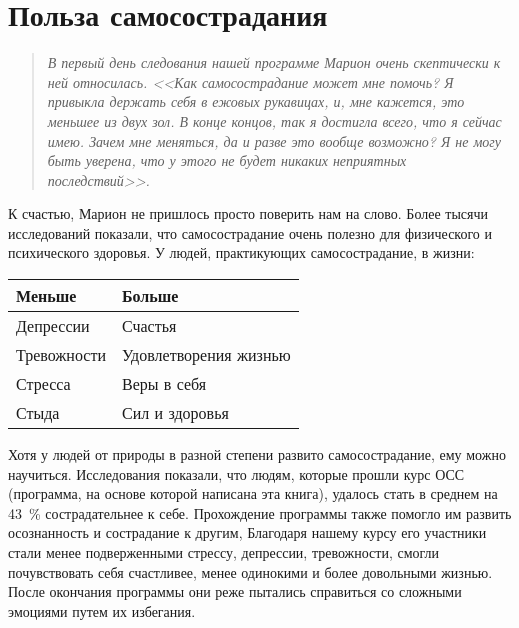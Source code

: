 
\chapter{Польза самосострадания} \label{The_Benefits_of_Self-Compassion}

\begin{quotation}
	\textit{В первый день следования нашей программе Марион очень скептически к ней относилась. <<Как самосострадание может мне помочь? Я привыкла держать себя в ежовых рукавицах, и, мне кажется, это меньшее из двух зол. В конце концов, так я достигла всего, что я сейчас имею. Зачем  мне меняться, да и разве это вообще возможно? Я не могу быть уверена, что у этого не будет никаких неприятных последствий>>.}
\end{quotation}

К счастью, Марион не пришлось просто поверить нам на слово. Более тысячи исследований показали, что самосострадание очень полезно для физического и психического здоровья. У людей, практикующих самосострадание, в жизни:

\begin{center}
	\setlength{\extrarowheight}{2mm}
	\begin{tabular}{p{4cm}p{5cm}}
		\textbf{Меньше} & \textbf{Больше} \\
		\hline \hline 
		Депрессии &	Счастья \\
		Тревожности	& Удовлетворения жизнью \\
		Стресса	& Веры в себя \\
		Стыда & Сил и здоровья \\
	\end{tabular}
	\setlength{\extrarowheight}{0mm}
\end{center}

\vspace{2ex}

Хотя у людей от природы в разной степени развито самосострадание, ему можно научиться. Исследования показали, что людям, которые прошли курс ОСС (программа, на основе которой написана эта книга), удалось стать в среднем на 43~\% сострадательнее к себе. Прохождение программы также помогло им развить осознанность и сострадание к другим, Благодаря нашему курсу его участники стали менее подверженными стрессу, депрессии, тревожности, смогли почувствовать себя счастливее, менее одинокими и более довольными жизнью. После окончания программы они реже пытались справиться со сложными эмоциями путем их избегания. 

